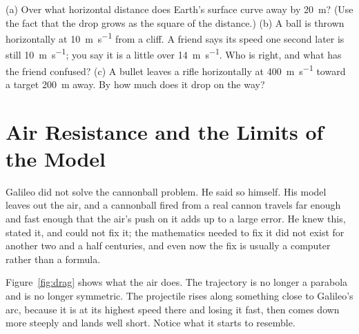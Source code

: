 \documentclass[11pt,twoside,openany]{book}
\newcounter{check}[chapter]
\begin{document}
\begin{checkbox}
(a) Over what horizontal distance does Earth's surface curve away by \SI{20}{\metre}? (Use the fact that the drop grows as the square of the distance.) (b) A ball is thrown horizontally at \SI{10}{\metre\per\second} from a cliff. A friend says its speed one second later is still \SI{10}{\metre\per\second}; you say it is a little over \SI{14}{\metre\per\second}. Who is right, and what has the friend confused? (c) A bullet leaves a rifle horizontally at \SI{400}{\metre\per\second} toward a target \SI{200}{\metre} away. By how much does it drop on the way?
\end{checkbox}

\section{Air Resistance and the Limits of the Model}
\label{sec:drag}

Galileo did not solve the cannonball problem. He said so himself. His model leaves out the air, and a cannonball fired from a real cannon travels far enough and fast enough that the air's push on it adds up to a large error. He knew this, stated it, and could not fix it; the mathematics needed to fix it did not exist for another two and a half centuries, and even now the fix is usually a computer rather than a formula.

Figure~\ref{fig:drag} shows what the air does. The trajectory is no longer a parabola and is no longer symmetric. The projectile rises along something close to Galileo's arc, because it is at its highest speed there and losing it fast, then comes down more steeply and lands well short. Notice what it starts to resemble.
\end{document}
